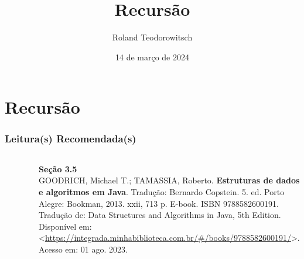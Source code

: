 \documentclass[aspectratio=169]{beamer}
\title[\sc{Recursão}]{Recursão}
\author[Roland Teodorowitsch]{Roland Teodorowitsch}
\institute[ALEST I - EP - PUCRS]{Algoritmos e Estruturas de Dados I - Escola Politécnica - PUCRS}
\date{14 de março de 2024}
\begin{document}
\justifying

\begin{frame}
	\titlepage
\end{frame}

\section{Recursão}

\begin{frame}\frametitle{Leitura(s) Recomendada(s)}

\begin{columns}[T]
\begin{column}{0.15\linewidth}
\vspace{-3mm}
\begin{figure}[h]
	\centering
	\includegraphics[height=0.3\paperheight]{imagens/livro_goodrich.jpg}
\end{figure}
\end{column}
\begin{column}{0.85\linewidth}
\vspace{3mm}
\textbf{Seção 3.5}\\
\scriptsize{GOODRICH, Michael T.; TAMASSIA, Roberto. \textbf{Estruturas de dados e algoritmos em Java}. Tradução: Bernardo Copstein. 5. ed. Porto Alegre: Bookman, 2013. xxii, 713 p. E-book. ISBN 9788582600191. Tradução de: Data Structures and Algorithms in Java, 5th Edition. Disponível em: \textless{}\url{https://integrada.minhabiblioteca.com.br/\#/books/9788582600191/}\textgreater{}. Acesso em: 01 ago. 2023.}
\end{column}
\end{columns}

\end{frame}
\end{document}
